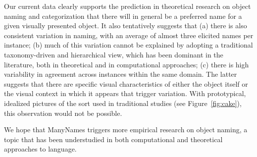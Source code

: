 

Our current data clearly supports the prediction in theoretical research on object naming and categorization that there will in general be a preferred name for a given visually presented object.
It also tentatively suggests that (a) there is also consistent variation in naming, with an average of almost three elicited names per instance; (b) much of this variation cannot be explained by adopting a traditional taxonomy-driven and hierarchical view, which has been dominant in the literature, both in theoretical and in computational approaches; (c) there is high variability in agreement across instances within the same domain.
The latter suggests that there are specific visual characteristics of either the object itself or the visual context in which it appears that trigger variation. With prototypical, idealized pictures of the sort used in traditional studies (see Figure\ \ref{fig:cake}), this observation would not be possible.

We hope that ManyNames triggers more empirical research on object naming, a topic that has been understudied in both computational and theoretical approaches to language.

